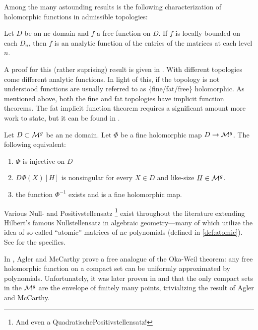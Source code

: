 Among the many astounding results is the following characterization of
holomorphic functions in admissible topologies:
\begin{theorem}
  Let \(D\) be an nc domain and \(f\) a free function on \(D\). If \(f\) is
  locally bounded on each \(D_n\), then \(f\) is an analytic function of the
  entries of the matrices at each level \(n\).
\end{theorem}
A proof for this (rather suprising) result is given in \cite{heltonProper2011}.
With different topologies come different analytic functions. In light of this,
if the topology is not understood functions are usually referred to as
\{fine/fat/free\} holomorphic.
As mentioned above, both the fine and fat topologies have implicit function
theorems. The fat implicit function theorem requires a significant amount more
work to state, but it can be found in \cite{aglerOperator2019}.
\begin{theorem}
  Let \(D \subset \mathcal{M}^g\) be an nc domain. Let \(\Phi\) be a fine holomorphic
  map \(D\to \mathcal{M}^{g} \). The following equivalent:
  \begin{enumerate}
    \item \(\Phi\) is injective on \(D\)
    \item \(D\Phi(X)[H]\) is nonsingular for every \(X \in D\) and like-size
          \(H \in \mathcal{M}^{g}\).
    \item the function \(\Phi ^{-1}\) exists and is a fine holomorphic
          map.
  \end{enumerate}
\end{theorem}

Various Null- and Positivstellensatz
\footnote{And even a QuadratischePositivstellensatz!} exist throughout the
literature extending Hilbert's famous Nullstellensatz in algebraic
geometry---many of which utilize the idea of so-called ``atomic'' matrices of nc
polynomials (defined in \cref{def:atomic}). See \cite{heltonFactorization2019}
for the specifics.

In \cite{aglerGlobal2013}, Agler and McCarthy prove a free analogue of the
Oka-Weil theorem: any free holomorphic function on a compact set
can be uniformly approximated by polynomials. Unfortunately, it was later proven
in \cite{pascoeInvariant2021} and \cite{augatCompact2017} that the only compact
sets in the \(\mathcal{M}^{g} \) are the envelope of finitely many points, trivializing
the result of Agler and McCarthy.



